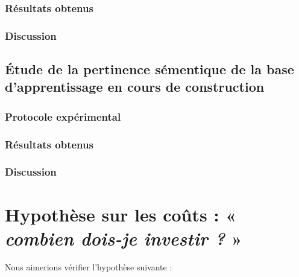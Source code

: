 			\subsubsection{Résultats obtenus}

			\subsubsection{Discussion}
		
		\subsection{Étude de la pertinence sémentique de la base d'apprentissage en cours de construction}
		
			\subsubsection{Protocole expérimental}

			\subsubsection{Résultats obtenus}

			\subsubsection{Discussion}
	

    \section{Hypothèse sur les coûts : « \textit{combien dois-je investir ?} »}
	\label{section:4.4-HYPOTHESE-COUTS}
	
		Nous aimerions vérifier l'hypothèse suivante :

